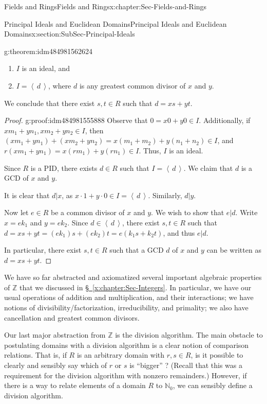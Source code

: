 \documentclass[oneside,10pt,]{book}
\newcommand{\xreffont}{\relax}
\numberwithin{equation}{section}
\newcommand{\ideal}[1]{\left\langle\, #1 \,\right\rangle}
\def\Z{{\mathbb Z}}
\def\N{{\mathbb N}}
\begin{document}
\begin{chapterptx}{Fields and Rings}{}{Fields and Rings}{}{}{x:chapter:Sec-Fields-and-Rings}
\begin{sectionptx}{Principal Ideals and Euclidean Domains}{}{Principal Ideals and Euclidean Domains}{}{}{x:section:SubSec-Principal-Ideals}
\begin{theorem}{}{}{g:theorem:idm484981562624}
\begin{enumerate}
\item{}\(I\) is an ideal, and%
\item{}\(I = \ideal{d}\), where \(d\) is any greatest common divisor of \(x\) and \(y\).%
\end{enumerate}
%
\par
We conclude that there exist \(s,t\in R\) such that \(d = xs + yt\).%
\end{theorem}
\begin{proof}{}{g:proof:idm484981555888}
Observe that \(0 = x0 + y0 \in I\). Additionally, if \(x m_1 + y n_1, x m_2 + y n_2\in I\), then \((x m_1 + y n_1) + (x m_2 + y n_2) = x (m_1 + m_2) + y (n_1 + n_2) \in I\), and \(r(x m_1 + y n_1) = x (rm_1) + y(rn_1) \in I\). Thus, \(I\) is an ideal.%
\par
Since \(R\) is a PID, there exists \(d\in R\) such that \(I = \ideal{d}\). We claim that \(d\) is a GCD of \(x\) and \(y\).%
\par
It is clear that \(d|x\), as \(x\cdot 1 + y\cdot 0\in I = \ideal{d}\). Similarly, \(d|y\).%
\par
Now let \(e\in R\) be a common divisor of \(x\) and \(y\). We wish to show that \(e|d\). Write \(x = e k_1\) and \(y = e k_2\). Since \(d\in \ideal{d}\), there exist \(s,t\in R\) such that \(d = x s + yt = (e k_1) s + (e k_2)t = e(k_1 s + k_2 t)\), and thus \(e|d\).%
\par
In particular, there exist \(s,t\in R\) such that a GCD \(d\) of \(x\) and \(y\) can be written as \(d = xs + yt\).%
\end{proof}
We have so far abstracted and axiomatized several important algebraic properties of \(\Z\) that we discussed in \hyperref[x:chapter:Sec-Integers]{§~{\xreffont\ref{x:chapter:Sec-Integers}}}. In particular, we have our usual operations of addition and multiplication, and their interactions; we have notions of divisibility\slash{}factorization, irreducibility, and primality; we also have cancellation and greatest common divisors.%
\par
Our last major abstraction from \(\Z\) is the division algorithm. The main obstacle to postulating domains with a division algorithm is a clear notion of comparison relations. That is, if \(R\) is an arbitrary domain with \(r,s\in R\), is it possible to clearly and sensibly say which of \(r\) or \(s\) is ``bigger'' ? (Recall that this was a requirement for the division algorithm with nonzero remainders.) However, if there is a way to relate elements of a domain \(R\) to \(\N_0\), we can sensibly define a division algorithm.%

\end{sectionptx}
\end{chapterptx}
\end{document}
